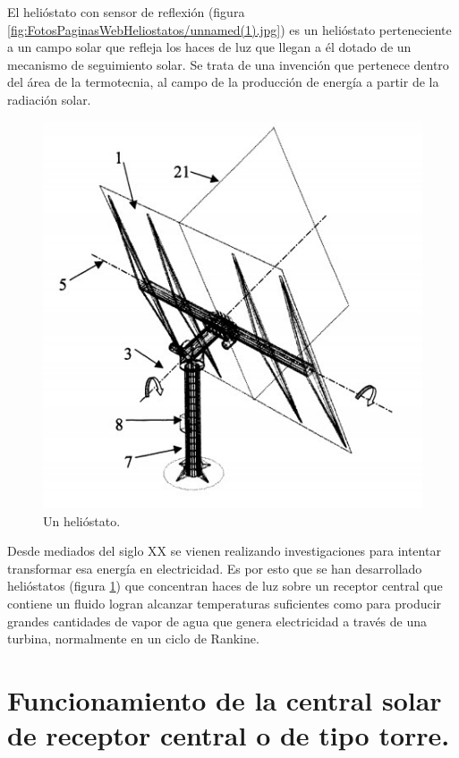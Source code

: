 El helióstato con sensor de reflexión (figura \ref{fig:FotosPaginasWebHeliostatos/unnamed(1).jpg}) es un helióstato perteneciente a un campo solar que refleja los haces de luz que llegan a él dotado de un mecanismo de seguimiento solar. Se trata de una invención que pertenece dentro del área de la termotecnia, al campo de la producción de energía a partir de la radiación solar.

\begin{figure}[h!]
  	\centering
	\includegraphics[scale=0.7]{FotosPaginasWebHeliostatos/unnamed.jpg}
	\caption{Un helióstato.~\cite{OepmWebSite} \label{fig:FotosPaginasWebHeliostatos/unnamed.jpg}}
\end{figure}

Desde mediados del siglo XX se vienen realizando investigaciones para intentar transformar esa energía en electricidad. Es por esto que se han desarrollado helióstatos (figura \ref{fig:FotosPaginasWebHeliostatos/unnamed.jpg}) que concentran haces de luz sobre un receptor central que contiene un fluido logran alcanzar temperaturas suficientes como para producir grandes cantidades de vapor de agua que genera electricidad a través de una turbina, normalmente en un ciclo de Rankine.

\cite{GstriatumWebSite} \cite{EcuRedWebSite}

\section{Funcionamiento de la central solar de receptor central o de tipo torre.}

